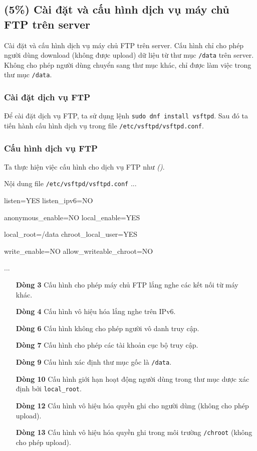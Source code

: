 \subsection{(5\%) Cài đặt và cấu hình dịch vụ máy chủ FTP trên server}
Cài đặt và cấu hình dịch vụ máy chủ FTP trên server. Cấu hình chỉ cho
phép người dùng download (không được upload) dữ liệu từ thư mục \texttt{/data} trên
server. Không cho phép người dùng chuyển sang thư mục khác, chỉ được làm việc
trong thư mục \texttt{/data}.

\subsubsection{Cài đặt dịch vụ FTP}

Để cài đặt dịch vụ FTP, ta sử dụng lệnh \texttt{sudo dnf install vsftpd}. Sau đó ta tiến hành cấu hình dịch vụ trong file \texttt{/etc/vsftpd/vsftpd.conf}.

\subsubsection{Cấu hình dịch vụ FTP}

Ta thực hiện việc cấu hình cho dịch vụ FTP
như \textit{()}.


\begin{coding}{Nội dung file \texttt{/etc/vsftpd/vsftpd.conf}}
  ...

  listen=YES
  listen_ipv6=NO

  anonymous_enable=NO
  local_enable=YES

  local_root=/data
  chroot_local_user=YES

  write_enable=NO
  allow_writeable_chroot=NO

  ...
\end{coding}

\begin{itemize}
  \item[\bfseries Dòng 3] Cấu hình cho phép máy chủ FTP lắng nghe các kết nối từ máy khác.
  \item[\bfseries Dòng 4] Cấu hình vô hiệu hóa lắng nghe trên IPv6.
  \item[\bfseries Dòng 6] Cấu hình không cho phép người vô danh truy cập.
  \item[\bfseries Dòng 7] Cấu hình cho phép các tài khoản cục bộ truy cập.
  \item[\bfseries Dòng 9] Cấu hình xác định thư mục gốc là \texttt{/data}.
  \item[\bfseries Dòng 10] Cấu hình giới hạn hoạt động người dùng trong thư mục dược xác định bởi \texttt{local\_root}.
  \item[\bfseries Dòng 12] Cấu hình vô hiệu hóa quyền ghi cho người dùng (không cho phép upload).
  \item[\bfseries Dòng 13] Cấu hình vô hiệu hóa quyền ghi trong môi trường \texttt{/chroot} (không cho phép upload).
\end{itemize}

